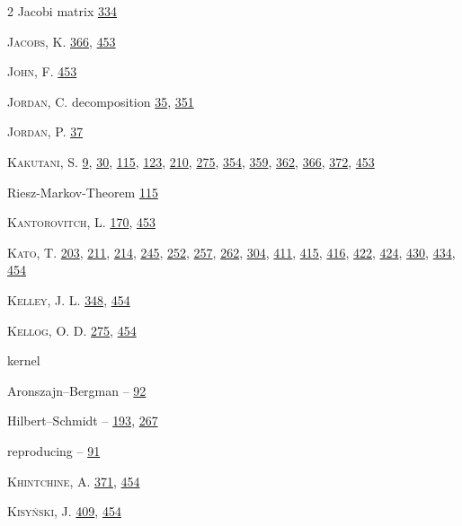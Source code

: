 \begin{multicols}{2}
\noindent Jacobi matrix \hyperlink{page.334}{334}\par
\noindent \textsc{Jacobs}, K. \hyperlink{page.366}{366}, \hyperlink{page.453}{453}\par
\noindent \textsc{John}, F. \hyperlink{page.453}{453}\par
\noindent \textsc{Jordan}, C. decomposition \hyperlink{page.35}{35}, \hyperlink{page.351}{351}\par
\noindent \textsc{Jordan}, P. \hyperlink{page.37}{37}\par
\noindent \textsc{Kakutani}, S. \hyperlink{page.9}{9}, \hyperlink{page.30}{30}, \hyperlink{page.115}{115}, \hyperlink{page.123}{123}, \hyperlink{page.210}{210}, \hyperlink{page.275}{275}, \hyperlink{page.354}{354}, \hyperlink{page.359}{359}, \hyperlink{page.362}{362}, \hyperlink{page.366}{366}, \hyperlink{page.372}{372}, \hyperlink{page.453}{453}\par
\noindent Riesz-Markov-Theorem \hyperlink{page.115}{115}\par
\noindent \textsc{Kantorovitch}, L. \hyperlink{page.170}{170}, \hyperlink{page.453}{453}\par
\noindent \textsc{Kato}, T. \hyperlink{page.203}{203}, \hyperlink{page.211}{211}, \hyperlink{page.214}{214}, \hyperlink{page.245}{245}, \hyperlink{page.252}{252}, \hyperlink{page.257}{257}, \hyperlink{page.262}{262}, \hyperlink{page.304}{304}, \hyperlink{page.411}{411}, \hyperlink{page.415}{415}, \hyperlink{page.416}{416}, \hyperlink{page.422}{422}, \hyperlink{page.424}{424}, \hyperlink{page.430}{430}, \hyperlink{page.434}{434}, \hyperlink{page.454}{454}\par
\noindent \textsc{Kelley}, J. L. \hyperlink{page.348}{348}, \hyperlink{page.454}{454}\par
\noindent \textsc{Kellog}, O. D. \hyperlink{page.275}{275}, \hyperlink{page.454}{454}\par
\noindent kernel\par
\hspace*{1.1em}Aronszajn--Bergman -- \hyperlink{page.92}{92}\par
\hspace*{1.1em}Hilbert--Schmidt -- \hyperlink{page.193}{193}, \hyperlink{page.267}{267}\par
\hspace*{1.1em}reproducing -- \hyperlink{page.91}{91}\par
\noindent \textsc{Khintchine}, A. \hyperlink{page.371}{371}, \hyperlink{page.454}{454}\par
\noindent \textsc{Kisyński}, J. \hyperlink{page.409}{409}, \hyperlink{page.454}{454}\par

\end{multicols}
